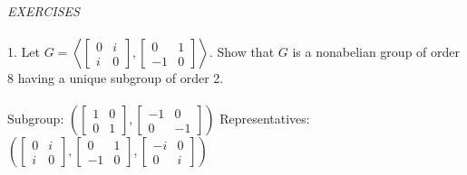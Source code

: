\documentclass{article}
\begin{document}
\begin{siderules}\color{blue}\textit{EXERCISES}\color{black}\\\\
\color{blue}1. Let \(G=\left\langle\begin{bmatrix}0&i\\i&0\end{bmatrix},\begin{bmatrix}0&1\\-1&0\end{bmatrix}\right\rangle \). Show that \(G\) is a nonabelian group of order 8 having a unique subgroup of order 2.\\\\\color{black}
\null\qquad Subgroup: \(\left(\begin{bmatrix}1&0\\0&1\end{bmatrix},\begin{bmatrix}-1&0\\0&-1\end{bmatrix}\right)\) Representatives:\(\left(\begin{bmatrix}0&i\\i&0\end{bmatrix},\begin{bmatrix}0&1\\-1&0\end{bmatrix},\begin{bmatrix}-i&0\\0&i\end{bmatrix}\right)\)
\end{siderules}
\end{document}
